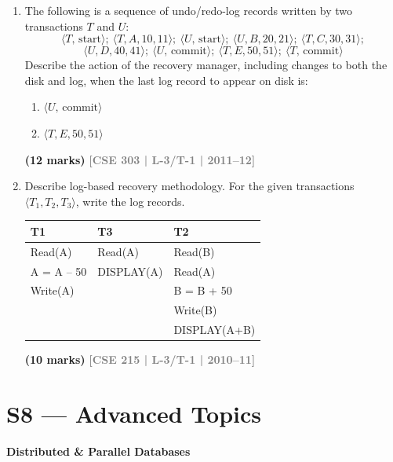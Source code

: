 \documentclass[12pt,a3paper]{article}
\newcommand{\yr}[1]{\hfill\textcolor{gray}{\small\textbf{[#1]}}}
\newcommand{\mk}[1]{\textcolor{orange!70!black}{\small\textbf{(#1 marks)}}}
\newcommand{\subtopic}[2]{%
  \vspace{10pt}
  \noindent\begin{tcolorbox}[colback=#1!8,colframe=#1,boxrule=0.6pt,arc=4pt,
    left=6pt,right=6pt,top=4pt,bottom=4pt]
    \small\bfseries\textcolor{#1}{#2}
  \end{tcolorbox}
  \vspace{2pt}
}
\begin{document}
\begin{enumerate}
\item The following is a sequence of undo/redo-log records written by two transactions $T$ and $U$:
\[\langle T,\,\text{start}\rangle;\ \langle T,A,10,11\rangle;\ \langle U,\,\text{start}\rangle;\ \langle U,B,20,21\rangle;\ \langle T,C,30,31\rangle;\]
\[\langle U,D,40,41\rangle;\ \langle U,\,\text{commit}\rangle;\ \langle T,E,50,51\rangle;\ \langle T,\,\text{commit}\rangle\]
Describe the action of the recovery manager, including changes to both the disk and log, when the last log record to appear on disk is:
\begin{enumerate}
  \item $\langle U,\,\text{commit}\rangle$
  \item $\langle T,E,50,51\rangle$
\end{enumerate}
  \mk{12} \yr{CSE 303 | L-3/T-1 | 2011--12}

\item Describe log-based recovery methodology. For the given transactions $\langle T_1, T_2, T_3 \rangle$, write the log records.

\medskip
\begin{center}
\begin{tabular}{lll}
\toprule
\textbf{T1} & \textbf{T3} & \textbf{T2}\\
\midrule
Read(A)      & Read(A)     & Read(B)\\
A = A -- 50  & DISPLAY(A)  & Read(A)\\
Write(A)     &             & B = B + 50\\
             &             & Write(B)\\
             &             & DISPLAY(A+B)\\
\bottomrule
\end{tabular}
\end{center}
\mk{10} \yr{CSE 215 | L-3/T-1 | 2010--11}

\end{enumerate}

\section{S8 --- Advanced Topics}
\label{sec:S8}

\subtopic{cE}{Distributed \& Parallel Databases}
\label{sub:s8-dist}
\end{document}
